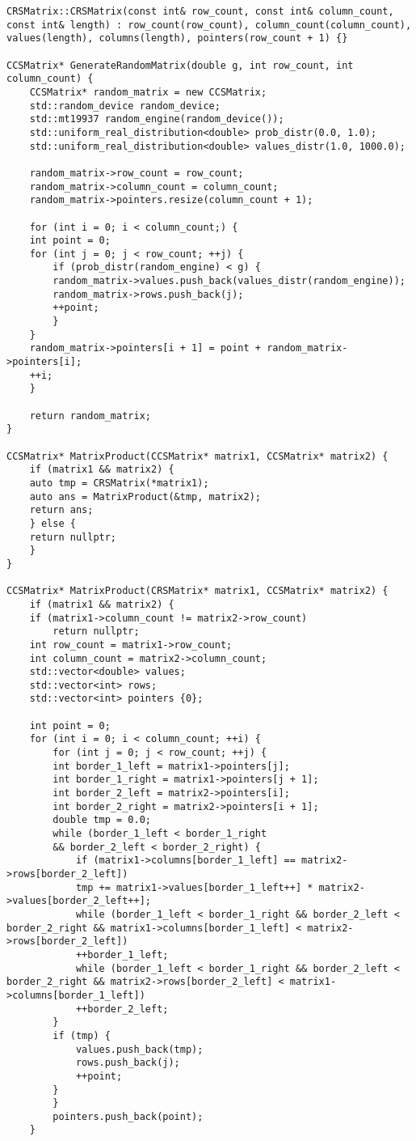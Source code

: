 \documentclass{report}
\begin{document}
\begin{lstlisting}
CRSMatrix::CRSMatrix(const int& row_count, const int& column_count, const int& length) : row_count(row_count), column_count(column_count), values(length), columns(length), pointers(row_count + 1) {}

CCSMatrix* GenerateRandomMatrix(double g, int row_count, int column_count) {
    CCSMatrix* random_matrix = new CCSMatrix;
    std::random_device random_device;
    std::mt19937 random_engine(random_device());
    std::uniform_real_distribution<double> prob_distr(0.0, 1.0);
    std::uniform_real_distribution<double> values_distr(1.0, 1000.0);

    random_matrix->row_count = row_count;
    random_matrix->column_count = column_count;
    random_matrix->pointers.resize(column_count + 1);

    for (int i = 0; i < column_count;) {
    int point = 0;
    for (int j = 0; j < row_count; ++j) {
        if (prob_distr(random_engine) < g) {
        random_matrix->values.push_back(values_distr(random_engine));
        random_matrix->rows.push_back(j);
        ++point;
        }
    }
    random_matrix->pointers[i + 1] = point + random_matrix->pointers[i];
    ++i;
    }

    return random_matrix;
}

CCSMatrix* MatrixProduct(CCSMatrix* matrix1, CCSMatrix* matrix2) {
    if (matrix1 && matrix2) {
    auto tmp = CRSMatrix(*matrix1);
    auto ans = MatrixProduct(&tmp, matrix2);
    return ans;
    } else {
    return nullptr;
    }
}

CCSMatrix* MatrixProduct(CRSMatrix* matrix1, CCSMatrix* matrix2) {
    if (matrix1 && matrix2) {
    if (matrix1->column_count != matrix2->row_count)
        return nullptr;
    int row_count = matrix1->row_count;
    int column_count = matrix2->column_count;
    std::vector<double> values;
    std::vector<int> rows;
    std::vector<int> pointers {0};

    int point = 0;
    for (int i = 0; i < column_count; ++i) {
        for (int j = 0; j < row_count; ++j) {
        int border_1_left = matrix1->pointers[j];
        int border_1_right = matrix1->pointers[j + 1];
        int border_2_left = matrix2->pointers[i];
        int border_2_right = matrix2->pointers[i + 1];
        double tmp = 0.0;
        while (border_1_left < border_1_right
        && border_2_left < border_2_right) {
            if (matrix1->columns[border_1_left] == matrix2->rows[border_2_left])
            tmp += matrix1->values[border_1_left++] * matrix2->values[border_2_left++];
            while (border_1_left < border_1_right && border_2_left < border_2_right && matrix1->columns[border_1_left] < matrix2->rows[border_2_left])
            ++border_1_left;
            while (border_1_left < border_1_right && border_2_left < border_2_right && matrix2->rows[border_2_left] < matrix1->columns[border_1_left])
            ++border_2_left;
        }
        if (tmp) {
            values.push_back(tmp);
            rows.push_back(j);
            ++point;
        }
        }
        pointers.push_back(point);
    }


\end{lstlisting}
\end{document}

